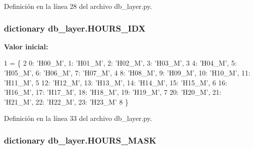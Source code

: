 Definición en la línea 28 del archivo db\-\_\-layer.\-py.

\hypertarget{namespacedb__layer_afb05786606d962ab2909e3436e531854}{
\subsubsection[{H\-O\-U\-R\-S\-\_\-\-I\-D\-X}]{\setlength{\rightskip}{0pt plus 5cm}dictionary db\-\_\-layer.\-H\-O\-U\-R\-S\-\_\-\-I\-D\-X}}\label{namespacedb__layer_afb05786606d962ab2909e3436e531854}
{\bfseries Valor inicial\-:}
\begin{DoxyCode}
1 = \{
2      0: \textcolor{stringliteral}{'H00\_M'},  1: \textcolor{stringliteral}{'H01\_M'},  2: \textcolor{stringliteral}{'H02\_M'},  3: \textcolor{stringliteral}{'H03\_M'},
3      4: \textcolor{stringliteral}{'H04\_M'},  5: \textcolor{stringliteral}{'H05\_M'},  6: \textcolor{stringliteral}{'H06\_M'},  7: \textcolor{stringliteral}{'H07\_M'},
4      8: \textcolor{stringliteral}{'H08\_M'},  9: \textcolor{stringliteral}{'H09\_M'}, 10: \textcolor{stringliteral}{'H10\_M'}, 11: \textcolor{stringliteral}{'H11\_M'},
5     12: \textcolor{stringliteral}{'H12\_M'}, 13: \textcolor{stringliteral}{'H13\_M'}, 14: \textcolor{stringliteral}{'H14\_M'}, 15: \textcolor{stringliteral}{'H15\_M'},
6     16: \textcolor{stringliteral}{'H16\_M'}, 17: \textcolor{stringliteral}{'H17\_M'}, 18: \textcolor{stringliteral}{'H18\_M'}, 19: \textcolor{stringliteral}{'H19\_M'},
7     20: \textcolor{stringliteral}{'H20\_M'}, 21: \textcolor{stringliteral}{'H21\_M'}, 22: \textcolor{stringliteral}{'H22\_M'}, 23: \textcolor{stringliteral}{'H23\_M'}
8 \}
\end{DoxyCode}


Definición en la línea 33 del archivo db\-\_\-layer.\-py.

\hypertarget{namespacedb__layer_ad6ee299a7034867156fb8100ec6864d7}{
\subsubsection[{H\-O\-U\-R\-S\-\_\-\-M\-A\-S\-K}]{\setlength{\rightskip}{0pt plus 5cm}dictionary db\-\_\-layer.\-H\-O\-U\-R\-S\-\_\-\-M\-A\-S\-K}}\label{namespacedb__layer_ad6ee299a7034867156fb8100ec6864d7}


